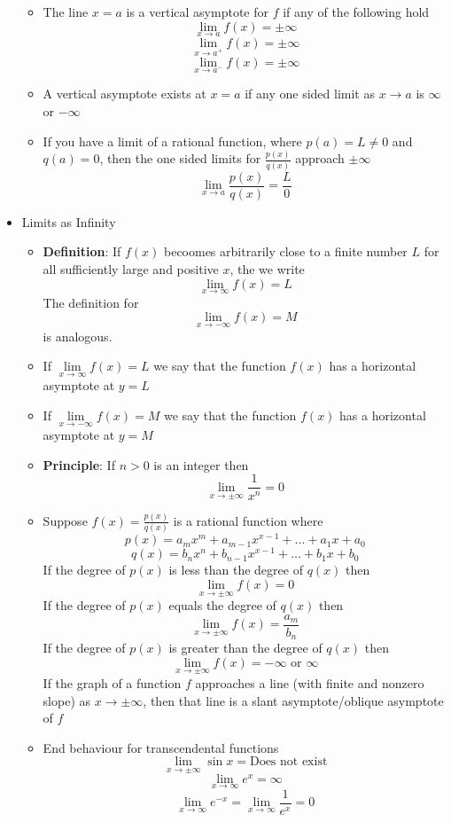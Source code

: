 \documentclass{article}
\begin{document}
\begin{itemize}
\begin{itemize}
		\item The line $x = a$ is a vertical asymptote for $f$ if any of the following hold
		$$\lim_{x \to a}{f(x)} = \pm \infty$$
		$$\lim_{x \to a^+}{f(x)} = \pm \infty$$
		$$\lim_{x \to a^-}{f(x)} = \pm \infty$$
		\item A vertical asymptote exists at $x = a$ if any one sided limit as $x \to a$ is $\infty$ or $- \infty$
		\item If you have a limit of a rational function, where $p(a) = L \neq 0$ and $q(a) = 0$, then the one sided limits for $\frac{p(x)}{q(x)}$ approach $\pm \infty$
		$$\lim_{x \to a}{\frac{p(x)}{q(x)}} = \frac{L}{0}$$
	\end{itemize}
	\item Limits as Infinity
	\begin{itemize}
		\item \textbf{Definition}: If $f(x)$ becoomes arbitrarily close to a finite number $L$ for all sufficiently large and positive $x$, the we write
		$$\lim_{x \to \infty}{f(x)} = L$$
		The definition for
		$$\lim_{x \to - \infty}{f(x)} = M$$
		is analogous.
		\item If $\lim\limits_{x \to \infty}{f(x)} = L$ we say that the function $f(x)$ has a horizontal asymptote at $y = L$
		\item If $\lim\limits_{x \to - \infty}{f(x)} = M$ we say that the function $f(x)$ has a horizontal asymptote at $y = M$
		\item \textbf{Principle}: If $n > 0$ is an integer then
		$$\lim_{x \to \pm \infty}{\frac{1}{x^n}} = 0$$
		\item Suppose $f(x) = \frac{p(x)}{q(x)}$ is a rational function where
		$$p(x) = a_mx^m + a_{m-1}x^{x-1} + ... + a_1x + a_0$$
		$$q(x) = b_nx^n + b_{n-1}x^{x-1} + ... + b_1x + b_0$$
		If the degree of $p(x)$ is less than the degree of $q(x)$ then
		$$\lim_{x \to \pm \infty}{f(x)} = 0$$
		If the degree of $p(x)$ equals the degree of $q(x)$ then
		$$\lim_{x \to \pm \infty}{f(x)} = \frac{a_m}{b_n}$$
		If the degree of $p(x)$ is greater than the degree of $q(x)$ then
		$$\lim_{x \to \pm \infty}{f(x)} = - \infty \text{ or } \infty$$
        If the graph of a function $f$ approaches a line (with finite and nonzero slope) as $x \to \pm \infty$, then that line is a slant asymptote/oblique asymptote of $f$
		\item End behaviour for transcendental functions
		$$\lim_{x \to \pm \infty}{\sin{x}} = \text{Does not exist}$$
		$$\lim_{x \to \infty}{e^x} = \infty$$
		$$\lim_{x \to \infty}{e^{-x}} = \lim_{x \to \infty}{\frac{1}{e^{x}}} = 0$$

\end{itemize}
\end{itemize}
\end{document}
